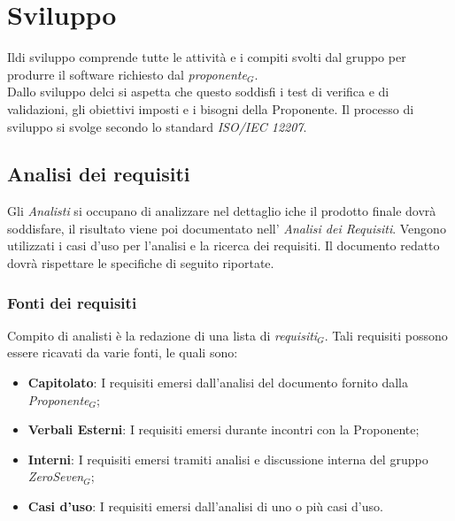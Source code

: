 
\section{Sviluppo}
Ildi sviluppo comprende tutte le attività e i compiti svolti dal gruppo per produrre il software richiesto dal \textit{proponente$_{G}$}.\\ Dallo sviluppo delci si aspetta che questo soddisfi i test di verifica e di validazioni, gli obiettivi imposti e i bisogni della Proponente. Il processo di sviluppo si svolge secondo lo standard \textit{ISO/IEC 12207}.
\subsection{Analisi dei requisiti}
Gli \textit{Analisti} si occupano di analizzare nel dettaglio iche il prodotto finale dovrà soddisfare, il risultato viene poi documentato nell' \textit{Analisi dei Requisiti}. Vengono utilizzati i casi d'uso per l'analisi e la ricerca dei requisiti.
Il documento redatto dovrà rispettare le specifiche di seguito riportate.
\subsubsection{Fonti dei requisiti}
Compito di analisti è la redazione di una lista di \textit{requisiti$_{G}$}. Tali requisiti possono essere ricavati da varie fonti, le quali sono:
\begin{itemize}
	\item \textbf{Capitolato}: I requisiti emersi dall'analisi del documento fornito dalla \textit{Proponente$_{G}$};
	\item \textbf{Verbali Esterni}: I requisiti emersi durante incontri con la Proponente;
	\item \textbf{Interni}: I requisiti emersi tramiti analisi e discussione interna del gruppo \textit{ZeroSeven$_{G}$};
	\item \textbf{Casi d'uso}: I requisiti emersi dall'analisi di uno o più casi d'uso.
\end{itemize}
